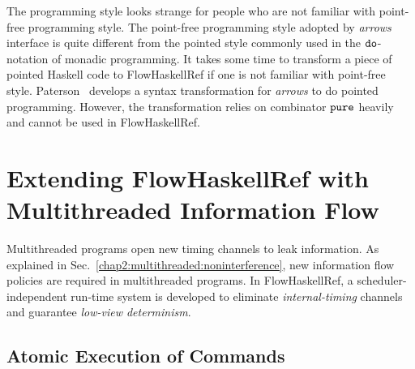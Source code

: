 \documentclass{report}
\newcommand{\co}[1]{$\cod{#1}$}
\begin{document}
The programming style looks strange for people who are not familiar with point-free programming style.
The point-free programming style adopted by {\em arrows} interface is quite different from the pointed style commonly
used in the \co{do}-notation of monadic programming. It takes some time to transform a piece of pointed Haskell 
code to FlowHaskellRef
if one is not familiar with point-free style.
Paterson~\cite{Paterson:ICFP01} develops a syntax transformation 
for {\em arrows} to do pointed programming. However, the transformation relies on combinator \co{pure} heavily and
cannot be used in FlowHaskellRef. 

\chapter{Extending FlowHaskellRef with Multithreaded Information Flow}
Multithreaded programs open new timing channels to leak information. As explained in 
Sec.~\ref{chap2:multithreaded:noninterference}, new information flow policies are
required in multithreaded programs. In FlowHaskellRef,
a scheduler-independent run-time system is developed to
eliminate {\em internal-timing} channels and guarantee {\em low-view determinism}. 

\section{Atomic Execution of Commands}
\label{chap7:atomicexecution}
\end{document}
